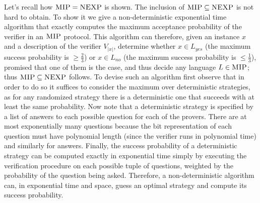 Let's recall how $\textsc{MIP} = \textsc{NEXP}$ is shown. 
 The inclusion of $\textsc{MIP} \subseteq \textsc{NEXP}$ is not hard to obtain. To show it we give a non-deterministic exponential time algorithm that exactly computes the maximum acceptance probability of the verifier in an $\textsc{MIP}$ protocol. This algorithm can therefore, given an instance $x$ and a description of the verifier $V_{|x|}$, determine whether $x\in L_{yes}$ (the maximum success probability is $\geq \frac{2}{3}$) or $x\in L_{no}$ (the maximum success probability is $\leq \frac{1}{3}$), promised that one of them is the case, and thus decide any language $L\in \textsc{MIP}$; thus $\textsc{MIP}\subseteq \textsc{NEXP}$ follows. To devise such an algorithm first observe that in order to do so it suffices to consider the maximum over deterministic strategies, as for any randomized strategy there is a deterministic one that succeeds with at least the same probability. Now note that a deterministic strategy is specified by a list of answers to each possible question for each of the provers. There are at most exponentially many questions because the bit representation of each question must have polynomial length (since the verifier runs in polynomial time) and similarly for answers. Finally, the success probability of a deterministic strategy can be computed exactly in exponential time simply by executing the verification procedure on each possible tuple of questions, weighted by the probability of the question being asked. Therefore, a non-deterministic algorithm can, in exponential time and space, guess an optimal strategy and compute its success probability. 

